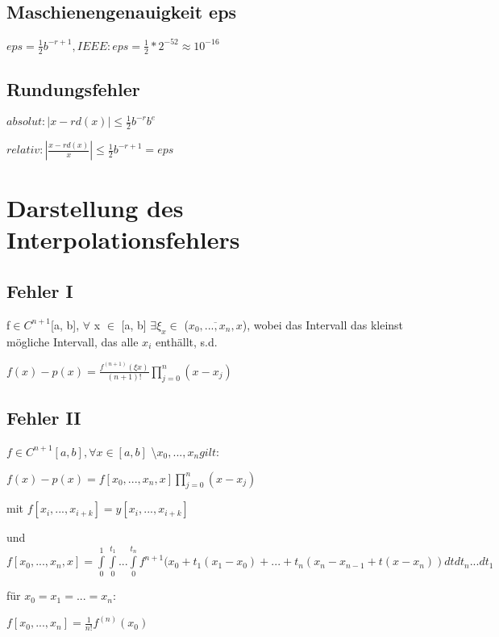 \documentclass[12pt,a4paper]{article} %
\begin{document}
	\subsection{Maschienengenauigkeit eps}
	
	$eps = \frac{1}{2}b^{-r + 1}, IEEE: eps = \frac{1}{2} * 2^{-52} \approx 10^{-16}$
	
	\subsection{Rundungsfehler}
	
	$absolut: |x - rd(x)| \le \frac{1}{2}b^{-r}b^e$
	
	$relativ: |\frac{x - rd(x)}{x}| \le \frac{1}{2}b^{-r+1} = eps$
	
	\newpage
	
	\section{Darstellung des Interpolationsfehlers}
	
	\subsection{Fehler I}
	
	f$ \in C^{n+1}$[a, b], $\forall$ x $\in$ [a, b] $\exists \xi_x \in$ ($\overline{x_0, ..., x_n, x}$), wobei das Intervall das kleinst mögliche Intervall, das alle $x_i$ enthällt, s.d.
	
	$f(x) - p(x) = \frac{f^{(n+1)}(\xi x)}{(n+1)!} \prod\limits_{j = 0}^{n}(x - x_j)$
	
	\subsection{Fehler II}
	
	$f \in C^{n + 1}[a, b], \forall x \in [a, b]$ \textbackslash ${x_0, ..., x_n} gilt:$
	
	$f(x) - p(x) = f[x_0, ..., x_n, x] \prod\limits_{j = 0}^{n}(x - x_j)$
	
	mit $f[x_i, ..., x_{i + k}] = y[x_i, ..., x_{i + k}]$
	
	und $f[x_0, ..., x_n, x] = \int\limits_{0}^{1}\int\limits_{0}^{t_1}...\int\limits_{0}^{t_n}f^{n+1}(x_0 + t_1(x_1 - x_0) + ... + t_n(x_n-x_{n - 1} + t(x - x_n))dtdt_n...dt_1$ 
	
	für $x_0 = x_1 = ... = x_n: $
	
	$f[x_0, ..., x_n] = \frac{1}{n!}f^{(n)}(x_0)$
	
\end{document}
